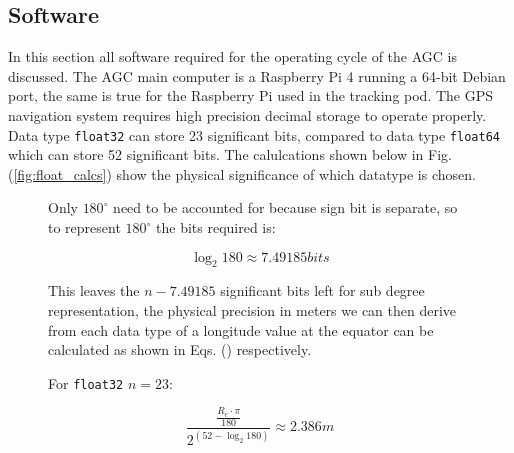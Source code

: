 \documentclass[11pt,landscape]{article}
\begin{document}
\begin{multicols}{3}
\section{Software}
\label{software}
In this section all software required for the operating cycle of the AGC is
discussed. The AGC main computer is a Raspberry Pi 4 running a 64-bit Debian port,
the same is true for the Raspberry Pi used in the tracking pod. The GPS
navigation system requires high precision decimal storage to operate properly.
Data type \verb|float32| can store 23 significant bits, compared to data type
\verb|float64| which can store 52 significant
bits\cite{floating_point_goldberg}. 
The calulcations shown below in Fig. (\ref{fig:float_calcs}) show the
physical significance of which datatype is chosen.
\begin{figure}[H]
    \begin{mdframed}
        Only $180^{\circ}$ need to be accounted for because sign bit is separate, so to
        represent $180^{\circ}$ the bits required is:
        \begin{center}
            \begin{equation*}
                \log_2{180} \approx 7.49185 bits
            \end{equation*}
        \end{center}
        This leaves the $n - 7.49185$ significant bits left for sub degree
        representation, the physical precision in meters we can then derive from each
        data type of a longitude value at the equator can be calculated as shown in
        Eqs. () respectively.\newline
        \begin{center}
            \begin{minipage}{0.45\textwidth}
                \begin{mdframed}
                    For \verb|float32| $n=23$:
                    \begin{center}
                        \begin{equation*}
                            \frac{\frac{R_e \cdot \pi}{180}}{2^{\left(52 - \log_2{180}\right)}} \approx 2.386m
                            \label{eq}
                        \end{equation*}
                    \end{center}
                \end{mdframed}
                \end{minipage}
                \begin{minipage}{0.45\textwidth}

\end{minipage}
\end{center}
\end{mdframed}
\end{figure}
\end{multicols}
\end{document}
